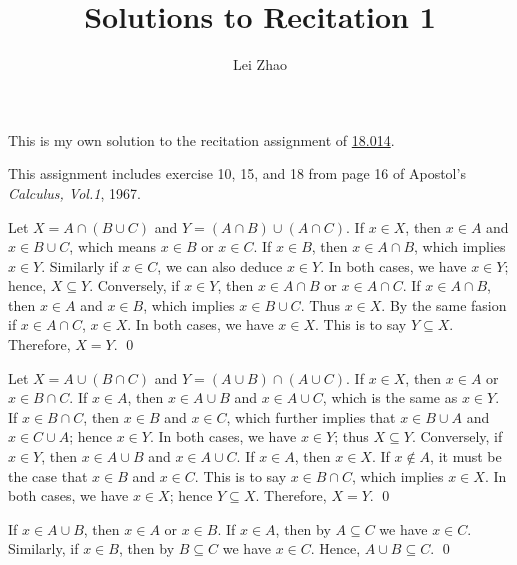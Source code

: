

\title{\bf Solutions to Recitation 1}
\author{Lei Zhao}


\maketitle
This is my own solution to the recitation assignment of
\href{https://ocw.mit.edu/courses/mathematics/18-014-calculus-with-theory-fall-2010/recitations/}{18.014}.

This assignment includes exercise 10, 15, and 18 from page 16 of
Apostol's \emph{Calculus, Vol.1}, 1967.


 {Let
  \(X = A \cap (B \cup C)\) and \(Y = (A \cap B) \cup (A \cap C)\).
  If \(x \in X\), then \(x \in A\) and \(x \in B \cup C\), which means
  \(x \in B\) or \(x \in C\).  If \(x \in B\), then
  \(x \in A \cap B\), which implies \(x \in Y\).  Similarly if
  \(x \in C\), we can also deduce \(x \in Y\).  In both cases, we have
  \(x \in Y\); hence, \(X \subseteq Y\).  Conversely, if \(x \in Y\),
  then \(x \in A \cap B\) or \(x \in A \cap C\).  If
  \(x \in A \cap B\), then \(x \in A\) and \(x \in B\), which implies
  \(x \in B \cup C\). Thus \(x \in X\).  By the same fasion if
  \(x \in A \cap C\), \(x \in X\).  In both cases, we have
  \(x \in X\).  This is to say \(Y \subseteq X\).  Therefore,
  \(X = Y\). \qed}

{\parasp Let \(X = A \cup (B \cap C)\) and
  \(Y = (A \cup B) \cap (A \cup C)\).  If \(x \in X\), then
  \(x \in A\) or \(x \in B \cap C\).  If \(x \in A\), then
  \(x \in A \cup B\) and \(x \in A \cup C\), which is the same as
  \(x \in Y\).  If \(x \in B \cap C\), then \(x \in B\) and
  \(x \in C\), which further implies that \(x \in B \cup A\) and
  \(x \in C \cup A\); hence \(x \in Y\).  In both cases, we have
  \(x \in Y\); thus \(X \subseteq Y\).  Conversely, if \(x \in Y\),
  then \(x \in A \cup B\) and \(x \in A \cup C\).  If \(x \in A\),
  then \(x \in X\).  If \(x \notin A\), it must be the case that
  \(x \in B\) and \(x \in C\).  This is to say \(x \in B \cap C\),
  which implies \(x \in X\).  In both cases, we have \(x \in X\);
  hence \(Y \subseteq X\).  Therefore, \(X = Y\). \qed}

  {If \(x \in A \cup B\), then \(x \in A\)
  or \(x \in B\).  If \(x \in A\), then by \(A \subseteq C\) we have
  \(x \in C\).  Similarly, if \(x \in B\), then by \(B \subseteq C\)
  we have \(x \in C\).  Hence, \(A \cup B \subseteq C\). \qed}


